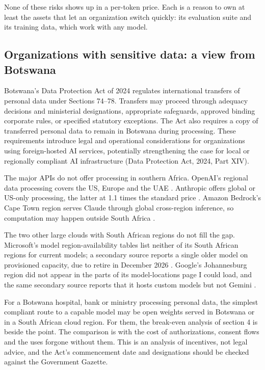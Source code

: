 None of these risks shows up in a per-token price. Each is a reason to own at least the assets that let an organization switch quickly: its evaluation suite and its training data, which work with any model.

\subsection{Organizations with sensitive data: a view from Botswana}

Botswana's Data Protection Act of 2024 regulates international transfers of personal data under Sections 74--78. Transfers may proceed through adequacy decisions and ministerial designations, appropriate safeguards, approved binding corporate rules, or specified statutory exceptions. The Act also requires a copy of transferred personal data to remain in Botswana during processing. These requirements introduce legal and operational considerations for organizations using foreign-hosted AI services, potentially strengthening the case for local or regionally compliant AI infrastructure (Data Protection Act, 2024, Part XIV).

The major APIs do not offer processing in southern Africa. OpenAI's regional data processing covers the US, Europe and the UAE \citep{openai2026data}. Anthropic offers global or US-only processing, the latter at 1.1 times the standard price \citep{anthropic2026residency}. Amazon Bedrock's Cape Town region serves Claude through global cross-region inference, so computation may happen outside South Africa \citep{aws2026bedrockza}.

The two other large clouds with South African regions do not fill the gap. Microsoft's model region-availability tables list neither of its South African regions for current models; a secondary source reports a single older model on provisioned capacity, due to retire in December 2026 \citep{microsoft2026regions}. Google's Johannesburg region did not appear in the parts of its model-locations page I could load, and the same secondary source reports that it hosts custom models but not Gemini \citep{google2026locations}.

 For a Botswana hospital, bank or ministry processing personal data, the simplest compliant route to a capable model may be open weights served in Botswana or in a South African cloud region. For them, the break-even analysis of section 4 is beside the point. The comparison is with the cost of authorizations, consent flows and the uses forgone without them. This is an analysis of incentives, not legal advice, and the Act's commencement date and designations should be checked against the Government Gazette.


